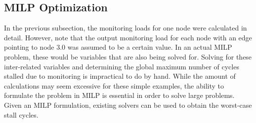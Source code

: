 \subsection{MILP Optimization}

In the previous subsection, the monitoring loads for one node were calculated
in detail. However, note that the output monitoring load for each node with an
edge pointing to node 3.0 was assumed to be a certain value. In an actual MILP
problem, these would be variables that are also being solved for. Solving for
these inter-related variables and determining the global maximum number of
cycles stalled due to monitoring is impractical to do by hand.  While the
amount of calculations may seem excessive for these simple examples, the
ability to formulate the problem in MILP is essential in order to solve large
problems. Given an MILP formulation, existing solvers \cite{lpsolve, cplex} can
be used to obtain the worst-case stall cycles.

